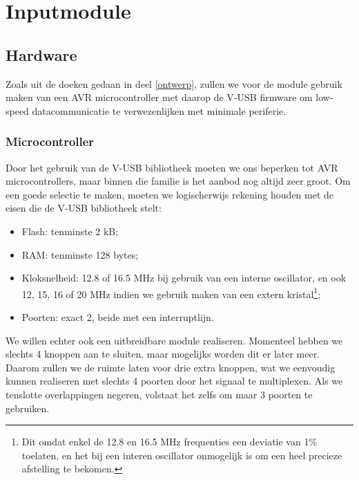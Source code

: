 \part{Inputmodule}
\label{inputmodule}

\chapter{Hardware}
\label{inputmodule:hardware}

Zoals uit de doeken gedaan in deel \ref{ontwerp}, zullen we voor de module gebruik maken van een AVR microcontroller met daarop de V-USB firmware om low-speed datacommunicatie te verwezenlijken met minimale periferie.

\section{Microcontroller}
\label{inputmodule:hardware:microcontroller}

Door het gebruik van de V-USB bibliotheek moeten we ons beperken tot AVR microcontrollers, maar binnen die familie is het aanbod nog altijd zeer groot. Om een goede selectie te maken, moeten we logischerwijs rekening houden met de eisen die de V-USB bibliotheek stelt:
\begin{itemize}
\item Flash: tenminste 2 kB;
\item RAM: tenminste 128 bytes;
\item Kloksnelheid: 12.8 of 16.5 MHz bij gebruik van een interne oscillator, en ook 12, 15, 16 of 20 MHz indien we gebruik maken van een extern kristal\footnote{Dit omdat enkel de 12.8 en 16.5 MHz frequenties een deviatie van 1\% toelaten, en het bij een interen oscillator onmogelijk is om een heel precieze afstelling te bekomen.};
\item Poorten: exact 2, beide met een interruptlijn.
\end{itemize}

We willen echter ook een uitbreidbare module realiseren. Momenteel hebben we slechts 4 knoppen aan te sluiten, maar mogelijks worden dit er later meer. Daarom zullen we de ruimte laten voor drie extra knoppen, wat we eenvoudig kunnen realiseren met slechts 4 poorten door het signaal te multiplexen. Als we tenslotte overlappingen negeren, volstaat het zelfs om maar 3 poorten te gebruiken.

